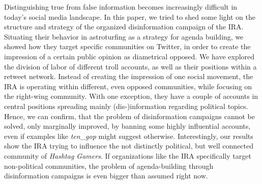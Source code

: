 \documentclass[12pt, titlepage=true, toc=bib]{scrartcl}
\begin{document}
Distinguishing true from false information becomes increasingly difficult in today's social media landscape. In this paper, we tried to shed some light on the structure and strategy of the organized disinformation campaign of the IRA. Situating their behavior in astroturfing as a strategy for agenda building, we showed how they target specific communities on Twitter, in order to create the impression of a certain public opinion as diametrical opposed. We have explored the division of labor of different troll accounts, as well as their positions within a retweet network. Instead of creating the impression of one social movement, the IRA is operating within different, even opposed communities, while focusing on the right-wing community. With one exception, they have a couple of accounts in central positions spreading mainly (dis-)information regarding political topics. Hence, we can confirm, that the problem of disinformation campaigns cannot be solved, only marginally improved, by banning some highly influential accounts, even if examples like \textit{ten\_gop} might suggest otherwise. Interestingly, our results show the IRA trying to influence the not distinctly political, but well connected community of \textit{Hashtag Gamers}. If organizations like the IRA specifically target non-political communities, the problem of agenda-building through disinformation campaigns is even bigger than assumed right now.
\end{document}
